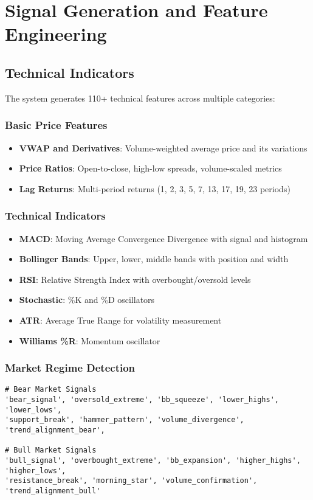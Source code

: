 \documentclass[11pt,a4paper]{article}
\begin{document}
\section{Signal Generation and Feature Engineering}

\subsection{Technical Indicators}

The system generates 110+ technical features across multiple categories:

\subsubsection{Basic Price Features}
\begin{itemize}
    \item \textbf{VWAP and Derivatives}: Volume-weighted average price and its variations
    \item \textbf{Price Ratios}: Open-to-close, high-low spreads, volume-scaled metrics
    \item \textbf{Lag Returns}: Multi-period returns (1, 2, 3, 5, 7, 13, 17, 19, 23 periods)
\end{itemize}

\subsubsection{Technical Indicators}
\begin{itemize}
    \item \textbf{MACD}: Moving Average Convergence Divergence with signal and histogram
    \item \textbf{Bollinger Bands}: Upper, lower, middle bands with position and width
    \item \textbf{RSI}: Relative Strength Index with overbought/oversold levels
    \item \textbf{Stochastic}: \%K and \%D oscillators
    \item \textbf{ATR}: Average True Range for volatility measurement
    \item \textbf{Williams \%R}: Momentum oscillator
\end{itemize}

\subsubsection{Market Regime Detection}
\begin{lstlisting}[caption={Bear Market Signals (common.py:505-600)}]
# Bear Market Signals
'bear_signal', 'oversold_extreme', 'bb_squeeze', 'lower_highs', 'lower_lows',
'support_break', 'hammer_pattern', 'volume_divergence', 'trend_alignment_bear',

# Bull Market Signals
'bull_signal', 'overbought_extreme', 'bb_expansion', 'higher_highs', 'higher_lows',
'resistance_break', 'morning_star', 'volume_confirmation', 'trend_alignment_bull'
\end{lstlisting}
\end{document}
